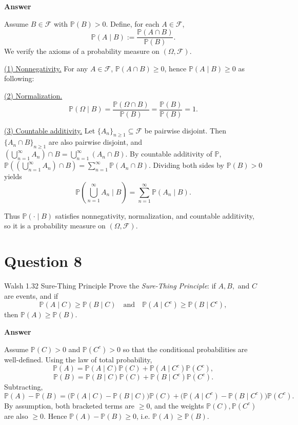 \documentclass[letterpaper]{article}
\begin{document}
		\textbf{Answer}
		
			Assume $B\in\mathcal{F}$ with $\mathbb{P}(B)>0$. Define, for each $A\in\mathcal{F}$,
			\[
			\mathbb{P}(A\mid B):=\frac{\mathbb{P}(A\cap B)}{\mathbb{P}(B)}.
			\]
			We verify the axioms of a probability measure on $(\Omega,\mathcal{F})$.
			
			\medskip
			\noindent\underline{(1) Nonnegativity.}
			For any $A\in\mathcal{F}$, $\mathbb{P}(A\cap B)\ge 0$, hence
			$\mathbb{P}(A\mid B)\ge 0$ as following:
			
			\medskip
			\noindent\underline{(2) Normalization.}
			\[
			\mathbb{P}(\Omega\mid B)=\frac{\mathbb{P}(\Omega\cap B)}{\mathbb{P}(B)}
			=\frac{\mathbb{P}(B)}{\mathbb{P}(B)}=1.
			\]
			
			\medskip
			\noindent\underline{(3) Countable additivity.}
			Let $\{A_n\}_{n\ge 1}\subseteq\mathcal{F}$ be pairwise disjoint. Then
			$\{A_n\cap B\}_{n\ge 1}$ are also pairwise disjoint, and $
			\left(\bigcup_{n=1}^\infty A_n\right)\cap B
			=\bigcup_{n=1}^\infty (A_n\cap B).$
			By countable additivity of $\mathbb{P}$, $
			\mathbb{P}\!\left(\left(\bigcup_{n=1}^\infty A_n\right)\cap B\right)
			=\sum_{n=1}^\infty \mathbb{P}(A_n\cap B).$
			Dividing both sides by $\mathbb{P}(B)>0$ yields
			\[
			\mathbb{P}\!\left(\bigcup_{n=1}^\infty A_n \mid B\right)
			=\sum_{n=1}^\infty \mathbb{P}(A_n\mid B).
			\]
			
			\medskip
			Thus $\mathbb{P}(\cdot\mid B)$ satisfies nonnegativity, normalization, and
			countable additivity, so it is a probability measure on $(\Omega,\mathcal{F})$.
		
		
		\clearpage
		
		\section{Question 8}
		{\color{deepred} Walsh 1.32 Sure-Thing Principle} Prove the \emph{Sure-Thing Principle}: if $A,B,$ and $C$ are events, and if
		\[
		\mathbb{P}(A \mid C) \ge \mathbb{P}(B \mid C)
		\quad \text{and} \quad
		\mathbb{P}(A \mid C^c) \ge \mathbb{P}(B \mid C^c),
		\]
		then $
		\mathbb{P}(A) \ge \mathbb{P}(B).$
		
		\textbf{Answer}
		
			Assume $\mathbb{P}(C)>0$ and $\mathbb{P}(C^c)>0$ so that the conditional
			probabilities are well-defined. Using the law of total probability,
			\[
			\mathbb{P}(A)=\mathbb{P}(A\mid C)\mathbb{P}(C)+\mathbb{P}(A\mid C^c)\mathbb{P}(C^c),
			\]
			\[
			\mathbb{P}(B)=\mathbb{P}(B\mid C)\mathbb{P}(C)+\mathbb{P}(B\mid C^c)\mathbb{P}(C^c).
			\]
			Subtracting,
			\[
			\mathbb{P}(A)-\mathbb{P}(B)
			=\bigl(\mathbb{P}(A\mid C)-\mathbb{P}(B\mid C)\bigr)\mathbb{P}(C)
			+\bigl(\mathbb{P}(A\mid C^c)-\mathbb{P}(B\mid C^c)\bigr)\mathbb{P}(C^c).
			\]
			By assumption, both bracketed terms are $\ge 0$, and the weights
			$\mathbb{P}(C),\mathbb{P}(C^c)$ are also $\ge 0$. Hence
			$\mathbb{P}(A)-\mathbb{P}(B)\ge 0$, i.e. $\mathbb{P}(A)\ge \mathbb{P}(B)$.
			
\end{document}
